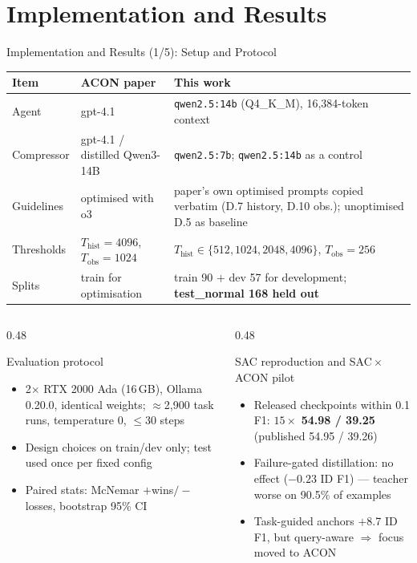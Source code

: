 \documentclass[aspectratio=169,10pt]{beamer}
\begin{document}
\section{Implementation and Results}
\begin{frame}{Implementation and Results (1/5): Setup and Protocol}
\centering
\scriptsize
\renewcommand{\arraystretch}{1.12}
\setlength{\tabcolsep}{4pt}
\begin{tabular}{p{}p{}p{}}
\toprule
\textbf{Item} & \textbf{ACON paper} & \textbf{This work}\\
\midrule
Agent       & gpt-4.1 & \texttt{qwen2.5:14b} (Q4\_K\_M), 16,384-token context\\
Compressor  & gpt-4.1 / distilled Qwen3-14B & \texttt{qwen2.5:7b}; \texttt{qwen2.5:14b} as a control\\
Guidelines  & optimised with o3 & paper's own optimised prompts copied verbatim (D.7 history, D.10 obs.); unoptimised D.5 as baseline\\
Thresholds  & $T_{\mathrm{hist}}=4096$, $T_{\mathrm{obs}}=1024$ & $T_{\mathrm{hist}}\in\{512,1024,2048,4096\}$, $T_{\mathrm{obs}}=256$\\
Splits      & train for optimisation & train 90 $+$ dev 57 for development; \textbf{test\_normal 168 held out}\\
\bottomrule
\end{tabular}

\vspace{0.15cm}
\begin{columns}[T]
\begin{column}{0.48\textwidth}
\begin{block}{Evaluation protocol}
\footnotesize
\begin{itemize}
  \item 2$\times$ RTX 2000 Ada (16\,GB), Ollama 0.20.0, identical weights;
        $\approx$2,900 task runs, temperature 0, $\le$30 steps
  \item Design choices on train/dev only; test used once per fixed config
  \item Paired stats: McNemar $+$wins$/-$losses, bootstrap 95\% CI
\end{itemize}
\end{block}
\end{column}
\begin{column}{0.48\textwidth}
\begin{block}{SAC reproduction and SAC\,$\times$\,ACON pilot}
\footnotesize
\begin{itemize}
  \item Released checkpoints within 0.1 F1: $15\times$ \textbf{54.98 / 39.25}
        (published 54.95 / 39.26)
  \item Failure-gated distillation: no effect ($-0.23$ ID F1) --- teacher
        worse on 90.5\% of examples
  \item Task-guided anchors $+$8.7 ID F1, but query-aware $\Rightarrow$ focus
        moved to ACON
\end{itemize}
\end{block}
\end{column}
\end{columns}
\end{frame}
\end{document}

